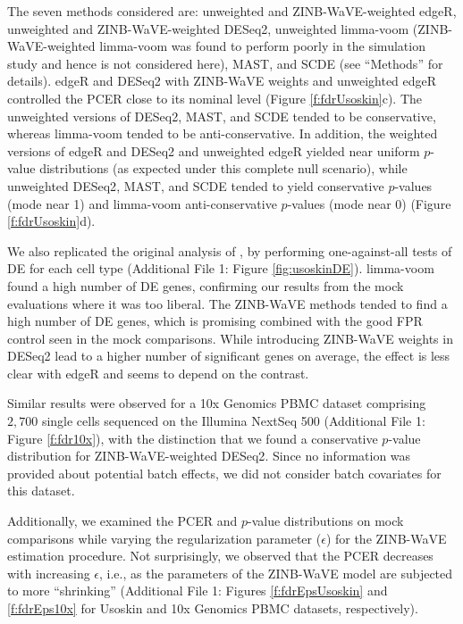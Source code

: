 \documentclass{bmcart}
\newcommand{\RPack}[1]{\textsf{#1}}
\begin{document}
The seven methods considered are: unweighted and ZINB-WaVE-weighted \RPack{edgeR}, unweighted and ZINB-WaVE-weighted \RPack{DESeq2}, unweighted limma-voom (ZINB-WaVE-weighted limma-voom was found to perform poorly in the simulation study and hence is not considered here), \RPack{MAST}, and \RPack{SCDE} (see ``Methods'' for details). 
\RPack{edgeR} and \RPack{DESeq2} with ZINB-WaVE weights and unweighted \RPack{edgeR} controlled the PCER close to its nominal level (Figure \ref{f:fdrUsoskin}c). The unweighted versions of \RPack{DESeq2}, \RPack{MAST}, and \RPack{SCDE} tended to be conservative, whereas limma-voom tended to be anti-conservative. In addition, the weighted versions of \RPack{edgeR} and \RPack{DESeq2} and unweighted \RPack{edgeR} yielded near uniform $p$-value distributions (as expected under this complete null scenario), while unweighted \RPack{DESeq2}, \RPack{MAST}, and \RPack{SCDE} tended to yield conservative $p$-values (mode near 1) and limma-voom anti-conservative $p$-values (mode near 0)  (Figure \ref{f:fdrUsoskin}d). 

We also replicated the original analysis of \citet{Usoskin2014}, by performing one-against-all tests of DE for each cell type (Additional File 1: Figure \ref{fig:usoskinDE}). limma-voom found a high number of DE genes, confirming our results from the mock evaluations where it was too liberal. The ZINB-WaVE methods tended to find a high number of DE genes, which is promising combined with the good FPR control seen in the mock comparisons. While introducing ZINB-WaVE weights in \RPack{DESeq2} lead to a higher number of significant genes on average, the effect is less clear with \RPack{edgeR} and seems to depend on the contrast.

Similar results were observed for a 10x Genomics PBMC dataset comprising $2,700$ single cells sequenced on the Illumina NextSeq 500 (Additional File 1: Figure \ref{f:fdr10x}), with the distinction that we found a conservative $p$-value distribution for ZINB-WaVE-weighted \RPack{DESeq2}. Since no information was provided about potential batch effects, we did not consider batch covariates for this dataset. 

Additionally, we examined the PCER and $p$-value distributions on mock comparisons while varying the regularization parameter ($\epsilon$) for the ZINB-WaVE estimation procedure. 
Not surprisingly, we observed that the PCER decreases with increasing $\epsilon$, i.e., as the parameters of the ZINB-WaVE model are subjected to more ``shrinking'' (Additional File 1: Figures \ref{f:fdrEpsUsoskin} and \ref{f:fdrEps10x} for Usoskin and 10x Genomics PBMC datasets, respectively). 
\end{document}
